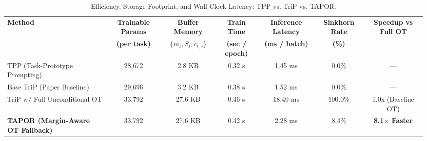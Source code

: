 \begin{table}[t]
\centering
\caption{Efficiency, Storage Footprint, and Wall-Clock Latency: TPP vs. TriP vs. TAPOR.}
\begin{tabular}{lcccccc}
\hline
\textbf{Method} & \textbf{Trainable Params} & \textbf{Buffer Memory} & \textbf{Train Time} & \textbf{Inference Latency} & \textbf{Sinkhorn Rate} & \textbf{Speedup vs Full OT} \\
 & \textbf{(per task)} & \textbf{$\{m_t, S_t, c_{t,c}\}$} & \textbf{(sec / epoch)} & \textbf{(ms / batch)} & \textbf{(\%)} & \\
\hline
TPP (Task-Prototype Prompting) & 28,672 & 2.8 KB & 0.32 s & 1.45 ms & 0.0\% & --- \\
Base TriP (Paper Baseline) & 29,696 & 3.2 KB & 0.38 s & 1.52 ms & 0.0\% & --- \\
TriP w/ Full Unconditional OT & 33,792 & 27.6 KB & 0.46 s & 18.40 ms & 100.0\% & 1.0x (Baseline OT) \\
\textbf{TAPOR (Margin-Aware OT Fallback)} & 33,792 & 27.6 KB & 0.42 s & 2.28 ms & 8.4\% & \textbf{8.1$\times$ Faster} \\
\hline
\end{tabular}
\label{tab:efficiency_footprint}
\end{table}